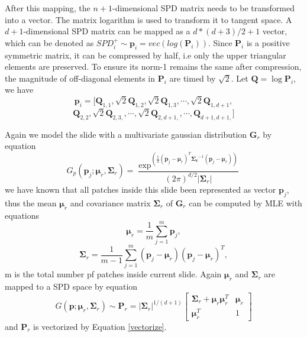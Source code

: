 After this mapping, the $n+1$-dimensional SPD matrix needs to be transformed into a vector. The matrix logarithm is used to transform it to tangent space. A $d+1$-dimensional SPD matrix can be mapped as a $d*(d+3)/2+1$ vector, which can be denoted as $SPD_i^+ \sim \bm{p}_i = vec(log(\bm{P}_i))$. Since $\bm{P}_i$ is a positive symmetric matrix, it can be compressed by half, i.e only the upper triangular elements are preserved. To ensure its norm-1 remains the same after compression, the magnitude of off-diagonal elements in $\bm{P}_i$ are timed by $\sqrt2$.  Let $\bm{Q}=\log{\bm{P}_i}$, we have
\begin{equation}\label{vectorize}
 \bm{p}_i = [\bm{Q}_{1,1},\sqrt2\bm{Q}_{1,2},\sqrt2\bm{Q}_{1,3},\cdots,\sqrt2\bm{Q}_{1,d+1},
 \end{equation}
 \begin{equation}
 \bm{Q}_{2,2},\sqrt2\bm{Q}_{2,3,},\cdots,\sqrt2\bm{Q}_{2,d+1,},\cdots,\bm{Q}_{d+1,d+1,}]
\end{equation}


Again we model the slide with a multivariate gaussian distribution $\bm{G}_r$ by equation
\begin{equation}
G_p(\bm{p}_j;\bm{\mu}_r,\bm{\Sigma}_r) = \frac{\exp^{(\frac{1}{2}(\bm{p}_j-\bm{\mu}_r)^T\bm{\Sigma_r}^{-1}(\bm{p}_j-\bm{\mu}_r))}}{(2\pi)^{d/2}|{\bm{\Sigma}_r|}} 
\end{equation}
we have known that all patches inside this slide been represented as vector $\bm{p}_j$, thus the mean $\bm{\mu}_r$ and covariance matrix ${\bm{\Sigma}}_r$ of $\bm{G}_r$ can be computed by MLE with equations
\begin{equation}
\bm{\mu}_r = \frac{1}{m}\sum_{j = 1}^m \bm{p}_j,
\end{equation}
\begin{equation}
\bm{\Sigma}_r = \frac{1}{m -1} \sum_{j = 1}^m(\bm{p}_j-\bm{\mu}_r)(\bm{p}_j-\bm{\mu}_r)^T,
\end{equation}
m is the total number pf patches inside current slide. Again $\bm{\mu}_r$ and $\bm{\Sigma}_r$ are mapped to a SPD space by equation
\begin{equation}
G(\bm{p};\bm{\mu}_r,\bm{\Sigma}_r) \sim \bm{P}_r  = |\bm{\Sigma}_r|^{1/(d+1)} \left[ \begin{matrix}
\bm{\Sigma}_r + \bm{\mu}_r\bm{\mu}_r^T & \bm{\mu}_r \\
\bm{\mu}_r^T & 1
\end{matrix}
\right]
\end{equation}
and $\bm{P}_r$ is vectorized by Equation \ref{vectorize}.

